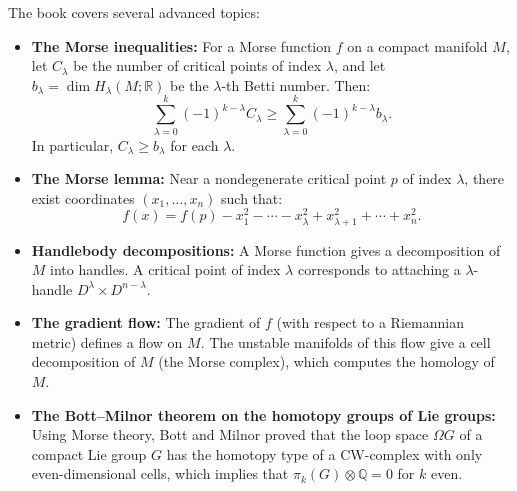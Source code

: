 The book covers several advanced topics:
\begin{itemize}
\item \textbf{The Morse inequalities:} For a Morse function $f$ on a compact manifold $M$, let $C_\lambda$ be the number of critical points of index $\lambda$, and let $b_\lambda = \dim H_\lambda(M;\mathbb{R})$ be the $\lambda$-th Betti number. Then:
\[
\sum_{\lambda=0}^k (-1)^{k-\lambda} C_\lambda \geq \sum_{\lambda=0}^k (-1)^{k-\lambda} b_\lambda.
\]
In particular, $C_\lambda \geq b_\lambda$ for each $\lambda$.

\item \textbf{The Morse lemma:} Near a nondegenerate critical point $p$ of index $\lambda$, there exist coordinates $(x_1, \ldots, x_n)$ such that:
\[
f(x) = f(p) - x_1^2 - \cdots - x_\lambda^2 + x_{\lambda+1}^2 + \cdots + x_n^2.
\]

\item \textbf{Handlebody decompositions:} A Morse function gives a decomposition of $M$ into handles. A critical point of index $\lambda$ corresponds to attaching a $\lambda$-handle $D^\lambda \times D^{n-\lambda}$.

\item \textbf{The gradient flow:} The gradient of $f$ (with respect to a Riemannian metric) defines a flow on $M$. The unstable manifolds of this flow give a cell decomposition of $M$ (the Morse complex), which computes the homology of $M$.

\item \textbf{The Bott--Milnor theorem on the homotopy groups of Lie groups:} Using Morse theory, Bott and Milnor proved that the loop space $\Omega G$ of a compact Lie group $G$ has the homotopy type of a CW-complex with only even-dimensional cells, which implies that $\pi_k(G) \otimes \mathbb{Q} = 0$ for $k$ even.
\end{itemize}

